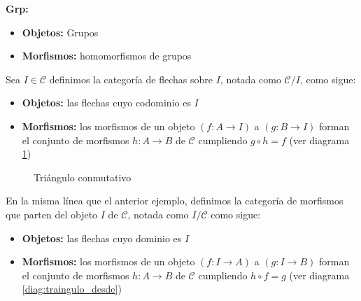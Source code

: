 \begin{ejemplo}
    \textbf{Grp: } 
    \begin{itemize}
        \item \textbf{Objetos: } Grupos
        \item \textbf{Morfismos: } homomorfismos de grupos
    \end{itemize}
\end{ejemplo}

\begin{ejemplo}
    Sea $I \in \mathscr{C}$ definimos la categoría de flechas sobre $I$, notada como $\mathscr{C}/I$, como sigue:
    \begin{itemize}
        \item \textbf{Objetos: } las flechas cuyo codominio es $I$
        \item \textbf{Morfismos: } los morfismos de un objeto $(f: A \longrightarrow I)$ a $(g: B \longrightarrow I)$ forman el conjunto de morfismos $h: A \longrightarrow B$ de $\mathscr{C}$ cumpliendo $g \circ h = f$ (ver diagrama \ref{diag:traingulo_hacia})
    \end{itemize}
\end{ejemplo}

\begin{figure}[htpb]
    \centering
    \caption{Triángulo conmutativo}
    \label{diag:traingulo_hacia}
\end{figure}

\begin{ejemplo}
    En la misma línea que el anterior ejemplo, definimos la categoría de morfismos que parten del objeto $I$ de $\mathscr{C}$, notada como $I / \mathscr{C}$ como sigue: 
    \begin{itemize}
        \item \textbf{Objetos: } las flechas cuyo dominio es $I$
        \item \textbf{Morfismos: } los morfismos de un objeto $(f: I \longrightarrow A)$ a $(g: I \longrightarrow B)$ forman el conjunto de morfismos $h: A \longrightarrow B$ de $\mathscr{C}$ cumpliendo $h \circ f = g$ (ver diagrama \ref{diag:traingulo_desde})
    \end{itemize}
\end{ejemplo}


